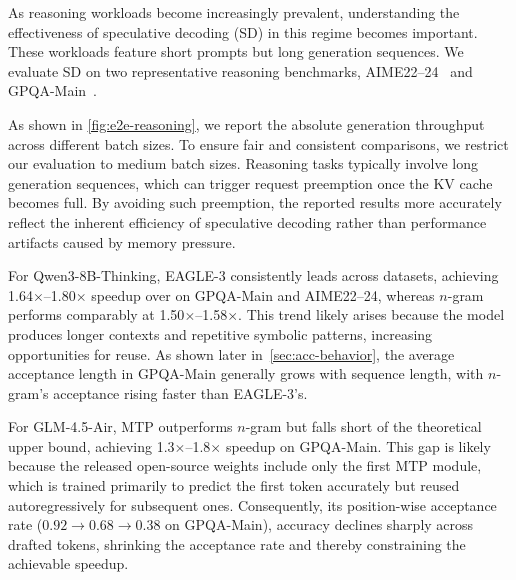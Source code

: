 As reasoning workloads become increasingly prevalent, understanding the effectiveness of speculative decoding (SD) in this regime becomes important. These workloads feature short prompts but long generation sequences. We evaluate SD on two representative reasoning benchmarks, AIME22–24~\cite{AIME-HF} and GPQA-Main~\cite{rein2023gpqagraduatelevelgoogleproofqa}.

As shown in \autoref{fig:e2e-reasoning}, we report the absolute generation throughput across different batch sizes. To ensure fair and consistent comparisons, we restrict our evaluation to medium batch sizes. Reasoning tasks typically involve long generation sequences, which can trigger request preemption once the KV cache becomes full. By avoiding such preemption, the reported results more accurately reflect the inherent efficiency of speculative decoding rather than performance artifacts caused by memory pressure.

For Qwen3-8B-Thinking, EAGLE-3 consistently leads across datasets, achieving 1.64$\times$--1.80$\times$ speedup over on GPQA-Main and AIME22–24, whereas $n$-gram performs comparably at 1.50$\times$--1.58$\times$. This trend likely arises because the model produces longer contexts and repetitive symbolic patterns, increasing opportunities for reuse. As shown later in~\autoref{sec:acc-behavior}, the average acceptance length in GPQA-Main generally grows with sequence length, with $n$-gram’s acceptance rising faster than EAGLE-3’s.

For GLM-4.5-Air, MTP outperforms $n$-gram but falls short of the theoretical upper bound, achieving 1.3$\times$--1.8$\times$ speedup on GPQA-Main. This gap is likely because the released open-source weights include only the first MTP module, which is trained primarily to predict the first token accurately but reused autoregressively for subsequent ones. Consequently, its position-wise acceptance rate (\(0.92 \rightarrow 0.68 \rightarrow 0.38\) on GPQA-Main), accuracy declines sharply across drafted tokens, shrinking the acceptance rate and thereby constraining the achievable speedup.


